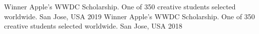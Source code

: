 \begin{cvhonors}
  \cvhonor
    {Winner}
    {Apple's WWDC Scholarship. One of 350 creative students selected worldwide.}
    {San Jose, USA}
    {2019}
  \cvhonor
    {Winner}
    {Apple's WWDC Scholarship. One of 350 creative students selected worldwide.}
    {San Jose, USA}
    {2018}
\end{cvhonors}
